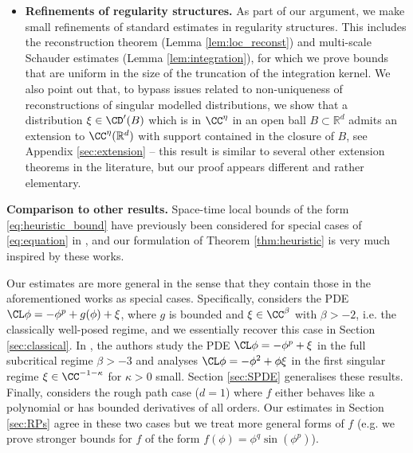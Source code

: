 \documentclass[11pt,a4paper]{article}
\numberwithin{equation}{section}
\theoremstyle{definition}
\theoremstyle{remark}
\def\R{{\mathbb R}}
\begin{document}
\begin{itemize}
  \item \textbf{Refinements of regularity structures.}
  As part of our argument, we make small refinements of standard estimates in regularity structures.
  This includes the reconstruction theorem (Lemma \ref{lem:loc_reconst}) and multi-scale Schauder estimates (Lemma \ref{lem:integration}),
  for which we prove bounds that are uniform in the size of the truncation of the integration kernel.
  We also point out that, to bypass issues related to non-uniqueness of reconstructions of singular modelled distributions,
  we show that a distribution $\xi\in\CD'(B)$ which is in $\CC^\eta$ in an open ball $B\subset \R^d$
  admits an extension to $\CC^\eta(\R^d)$ with support contained in the closure of $B$, see Appendix \ref{sec:extension} --
  this result is similar to several other extension theorems in the literature, but our proof appears different and rather elementary.
\end{itemize}


\textbf{Comparison to other results.}
Space-time local bounds of the form \eqref{eq:heuristic_bound} have previously been considered for special cases of \eqref{eq:equation} in \cite{MW20_reaction,MoinatWeber20,CMW23,BCMW22,Jin_Perkowski_25},
and our formulation of Theorem \ref{thm:heuristic} is very much inspired by these works.

Our estimates are more general in the sense that they contain those in the aforementioned works as special cases.
Specifically, \cite{MW20_reaction} considers the PDE $\CL\phi = -\phi^p + g(\phi) + \xi$, where $g$ is bounded and $\xi\in\CC^\beta$ with $\beta>-2$, i.e. the classically well-posed regime,
and we essentially recover this case in Section \ref{sec:classical}.
In \cite{MoinatWeber20,CMW23}, the authors study the PDE $\CL\phi = -\phi^p +\xi$ in the full subcritical regime $\beta>-3$ and \cite{Jin_Perkowski_25} analyses $\CL\phi = -\phi^2 + \phi\xi$ in the first singular regime $\xi \in \CC^{-1-\kappa}$ for $\kappa>0$ small.
Section \ref{sec:SPDE} generalises these results.
Finally, \cite{BCMW22} considers the rough path case ($d=1$) where $f$ either behaves like a polynomial or has bounded derivatives of all orders. Our estimates in Section \ref{sec:RPs} agree in these two cases but we treat more general forms of $f$ (e.g. we prove stronger bounds for $f$ of the form $f(\phi)=\phi^q\sin(\phi^p)$).
\end{document}
